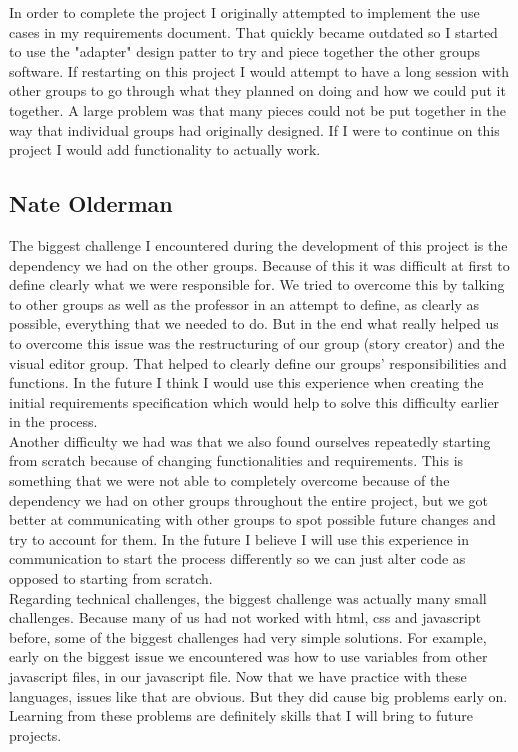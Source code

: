 \documentclass[12pt]{article}
\begin{document}
In order to complete the project I originally attempted to implement the use cases in my requirements document.  That quickly became outdated so I started to use the "adapter" design patter to try and piece together the other groups software.  If restarting on this project I would attempt to have a long session with other groups to go through what they planned on doing and how we could put it together.  A large problem was that many pieces could not be put together in the way that individual groups  had originally designed.  If I were to continue on this project I would add functionality to actually work.

\subsection{Nate Olderman}
The biggest challenge I encountered during the development of this project is the dependency we had on the other groups. Because of this it was difficult at first to define clearly what we were responsible for. We tried to overcome this by talking to other groups as well as the professor in an attempt to define, as clearly as possible, everything that we needed to do. But in the end what really helped us to overcome this issue was the restructuring of our group (story creator) and the visual editor group. That helped to clearly define our groups' responsibilities and functions. In the future I think I would use this experience when creating the initial requirements specification which would help to solve this difficulty earlier in the process. \\
Another difficulty we had was that we also found ourselves repeatedly starting from scratch because of changing functionalities and requirements. This is something that we were not able to completely overcome because of the dependency we had on other groups throughout the entire project, but we got better at communicating with other groups to spot possible future changes and try to account for them. In the future I believe I will use this experience in communication to start the process differently so we can just alter code as opposed to starting from scratch. \\
Regarding technical challenges, the biggest challenge was actually many small challenges. Because many of us had not worked with html, css and javascript before, some of the biggest challenges had very simple solutions. For example, early on the biggest issue we encountered was how to use variables from other javascript files, in our javascript file. Now that we have practice with these languages, issues like that are obvious. But they did cause big problems early on. Learning from these problems are definitely skills that I will bring to future projects. \\
\end{document}
